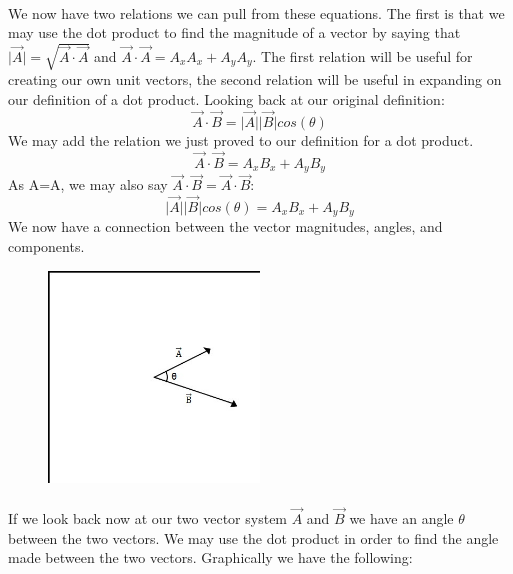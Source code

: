 \documentclass[12pt, letterpaper]{report}
\begin{document}
		\paragraph{} We now have two relations we can pull from these equations. The first is that we may use the dot product to find the magnitude of a vector by saying that $\lvert\vec{A}\rvert = \sqrt{\vec{A}\cdot\vec{A}}$ and $\vec{A}\cdot\vec{A} = A_xA_x + A_yA_y$. The first relation will be useful for creating our own unit vectors, the second relation will be useful in expanding on our definition of a dot product. Looking back at our original definition:
		\begin{equation*}
		\vec{A}\cdot\vec{B}=\lvert\vec{A}\rvert\lvert\vec{B}\rvert cos\left(\theta\right)
		\end{equation*}
		We may add the relation we just proved to our definition for a dot product.
		\begin{equation*}
		\vec{A}\cdot\vec{B} = A_xB_x + A_yB_y
		\end{equation*}
As A=A, we may also say $\vec{A}\cdot\vec{B}=\vec{A}\cdot\vec{B}$: 
		\begin{equation*}
		\lvert\vec{A}\rvert\lvert\vec{B}\rvert cos\left(\theta\right) = A_xB_x + A_yB_y
		\end{equation*}
We now have a connection between the vector magnitudes, angles, and components. 
		\begin{figure}[ht]
		\centering
		\includegraphics[width=0.5\textwidth]{Processing Images/VectorDotProduct/VectorDotProduct.jpg}
		\caption{}
		\end{figure}
		\paragraph{} If we look back now at our two vector system $\vec{A}$ and $\vec{B}$ we have an angle $\theta$ between the two vectors. We may use the dot product in order to find the angle made between the two vectors. Graphically we have the following: 
\end{document}
